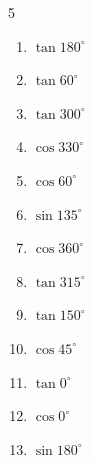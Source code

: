 \begin{multicols}{5}
\begin{enumerate}
  \item $\displaystyle \tan{180^\circ}$

        \phantom{$\displaystyle =0$}

  \item $\displaystyle \tan{60^\circ}$


  \item $\displaystyle \tan{300^\circ}$


  \item $\displaystyle \cos{330^\circ}$


\columnbreak %

  \item $\displaystyle \cos{60^\circ}$


  \item $\displaystyle \sin{135^\circ}$


  \item $\displaystyle \cos{360^\circ}$

        \phantom{$\displaystyle =1$}

  \item $\displaystyle \tan{315^\circ}$

        \phantom{$\displaystyle =-1$}

  \item $\displaystyle \tan{150^\circ}$


  \item $\displaystyle \cos{45^\circ}$


  \item $\displaystyle \tan{0^\circ}$

        \phantom{$\displaystyle =0$}

  \item $\displaystyle \cos{0^\circ}$

        \phantom{$\displaystyle =1$}

  \item $\displaystyle \sin{180^\circ}$


\end{enumerate}
\end{multicols}
